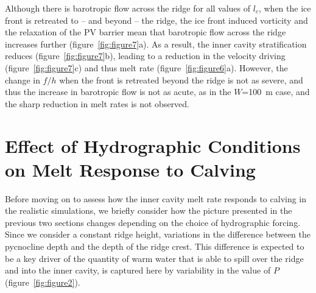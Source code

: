\documentclass[draft]{agujournal2019}
\begin{document}
Although there is barotropic flow across the ridge for all values of $l_c$, when the ice front is retreated to -- and beyond -- the ridge, the ice front induced vorticity and the relaxation of the PV barrier mean that barotropic flow across the ridge increases further (figure~\ref{fig:figure7}a). As a result, the inner cavity stratification reduces (figure~\ref{fig:figure7}b), leading to a reduction in the velocity driving (figure~\ref{fig:figure7}c) and thus melt rate (figure~\ref{fig:figure6}a). However, the change in $f/h$ when the front is retreated beyond the ridge is not as severe, and thus the increase in barotropic flow is not as acute, as in the $W$=100~m case, and the sharp reduction in melt rates is not observed.



\section{Effect of Hydrographic Conditions on Melt Response to Calving}\label{S:Results:P}
Before moving on to assess how the inner cavity melt rate responds to calving in the realistic simulations, we briefly consider how the picture presented in the previous two sections changes depending on the choice of hydrographic forcing. Since we consider a constant ridge height, variations in the difference between the pycnocline depth and the depth of the ridge crest. This difference is expected to be a key driver of the quantity of warm water that is able to spill over the ridge and into the inner cavity, is captured here by variability in the value of $P$ (figure~\ref{fig:figure2}).
\end{document}
